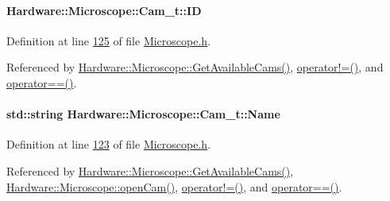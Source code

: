 \hypertarget{struct_hardware_1_1_microscope_1_1_cam__t_a870c5b29e3b987dce2a82308165cd178}{}
\paragraph[{I\+D}]{ Hardware\+::\+Microscope\+::\+Cam\+\_\+t\+::\+I\+D}\label{struct_hardware_1_1_microscope_1_1_cam__t_a870c5b29e3b987dce2a82308165cd178}


Definition at line \hyperlink{_microscope_8h_source_l00125}{125} of file \hyperlink{_microscope_8h_source}{Microscope.\+h}.



Referenced by \hyperlink{_microscope_8cpp_source_l00047}{Hardware\+::\+Microscope\+::\+Get\+Available\+Cams()}, \hyperlink{_microscope_8h_source_l00139}{operator!=()}, and \hyperlink{_microscope_8h_source_l00132}{operator==()}.

\hypertarget{struct_hardware_1_1_microscope_1_1_cam__t_abadd87f124923661f2e94d78cee3dbf4}{}
\paragraph[{Name}]{\setlength{\rightskip}{0pt plus 5cm}std\+::string Hardware\+::\+Microscope\+::\+Cam\+\_\+t\+::\+Name}\label{struct_hardware_1_1_microscope_1_1_cam__t_abadd87f124923661f2e94d78cee3dbf4}


Definition at line \hyperlink{_microscope_8h_source_l00123}{123} of file \hyperlink{_microscope_8h_source}{Microscope.\+h}.



Referenced by \hyperlink{_microscope_8cpp_source_l00047}{Hardware\+::\+Microscope\+::\+Get\+Available\+Cams()}, \hyperlink{_microscope_8cpp_source_l00167}{Hardware\+::\+Microscope\+::open\+Cam()}, \hyperlink{_microscope_8h_source_l00139}{operator!=()}, and \hyperlink{_microscope_8h_source_l00132}{operator==()}.

\hypertarget{struct_hardware_1_1_microscope_1_1_cam__t_a5cadb56c325736da812520b51c7fd65c}{}
